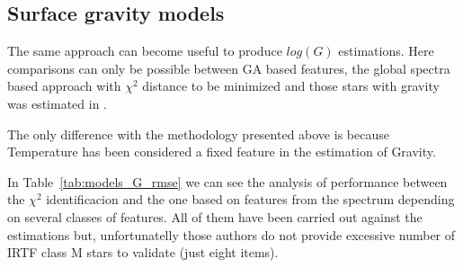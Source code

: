 \subsection{Surface gravity models}

The same approach can become useful to produce $log(G)$ estimations. 
Here comparisons can only be possible between GA based features, the 
global spectra based approach with $\chi^2$ distance
to be minimized and those stars with gravity was 
estimated in  \cite{2013A&A...549A.129C}.

The only difference with the methodology presented above is because
Temperature has been considered a fixed feature in the estimation of 
Gravity.

In Table~\ref{tab:models_G_rmse} 
we can see the analysis of performance between
the $\chi^2$ identificacion and the one based on features from the spectrum
depending on several classes of features. All of them have been carried out
against the \cite{Cesetti} estimations but, unfortunatelly those authors 
do not provide excessive number of IRTF class M stars to validate (just eight items).

